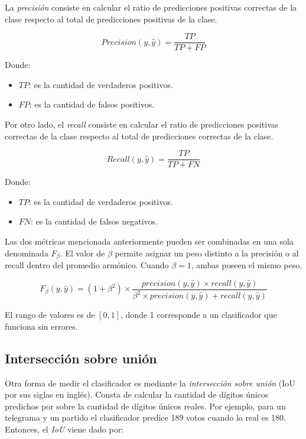 La {\it precisi\'on} consiste en calcular el ratio de predicciones positivas correctas de la clase respecto al total de
predicciones positivas de la clase.

\begin{equation}
    Precision(y, \hat{y}) = \frac{TP}{TP + FP}
\end{equation}

Donde:
\begin{itemize}
    \item $TP$: es la cantidad de verdaderos positivos.
    \item $FP$: es la cantidad de falsos positivos.
\end{itemize}

Por otro lado, el {\it recall} consiste en calcular el ratio de predicciones positivas correctas de la clase respecto
al total de predicciones correctas de la clase.

\begin{equation}
    Recall(y, \hat{y}) = \frac{TP}{TP + FN}
\end{equation}

Donde:
\begin{itemize}
    \item $TP$: es la cantidad de verdaderos positivos.
    \item $FN$: es la cantidad de falsos negativos.
\end{itemize}

Las dos m\'etricas mencionada anteriormente pueden ser combinadas en una sola denominada $F_{\beta}$. El valor de
$\beta$ permite asignar un peso distinto a la precisi\'on o al recall dentro del promedio arm\'onico. Cuando $\beta=1$,
ambas poseen el mismo peso.

\begin{equation}
    F_{\beta}(y, \hat{y}) = (1 + \beta^2) \times \frac{precision(y, \hat{y}) \times recall(y, \hat{y})}{\beta^2 \times precision(y, \hat{y}) + recall(y, \hat{y})}
\end{equation}

El rango de valores es de $[0, 1]$, donde 1 corresponde a un clasificador que funciona sin errores.

\subsection{Intersecci\'on sobre uni\'on}

Otra forma de medir el clasificador es mediante la {\it intersecci\'on sobre uni\'on} (IoU por sus siglas en ingl\'es).
Consta de calcular la cantidad de d\'igitos \'unicos predichos por sobre la cantidad de d\'igitos \'unicos reales. Por
ejemplo, para un telegrama y un partido el clasificador predice 189 votos cuando lo real es 180. Entonces, el {\it IoU}
viene dado por:

